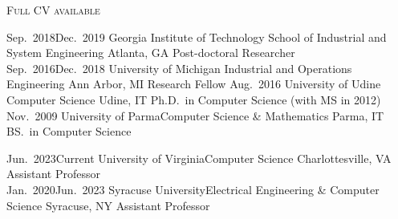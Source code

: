 \documentclass[localFont,alternative]{documentMETADATA}
\begin{document}
\makecvheader\sloppy\allowdisplaybreaks


	\makecvfooter
		{\textsc{}} %
		{\textsc{Full CV available  }}
		{\thepage}




\vspace{-6pt}
\begin{experiences}
  \job
    {Sep.~2018}{Dec.~2019}
    {Georgia Institute of Technology}
    {School of Industrial and System Engineering}
    {Atlanta, GA}
    {Post-doctoral Researcher}\\[-10pt]
  \job
    {Sep.~2016}{Dec.~2018}
    {University of Michigan}
    {Industrial and Operations Engineering}
    {Ann Arbor, MI}
    {Research Fellow}
  \job
    {}{Aug.~2016}
    {University of Udine}%
    {Computer Science}
    {Udine, IT}
    {Ph.D.~in Computer Science (with MS in 2012)}
  \job
    {}{Nov.~2009}
    {University of Parma}{Computer Science \& Mathematics}
    {Parma, IT}
    {BS.~in Computer Science}
\end{experiences}

\vspace{-6pt}
\begin{experiences}
  \job
    {Jun.~2023}{Current}
    {University of Virginia}{Computer Science}
    {Charlottesville, VA}
    {Assistant Professor}\\[-10pt]
  \job
    {Jan.~2020}{Jun.~2023}
    {Syracuse University}{Electrical Engineering \& Computer Science}
    {Syracuse, NY}
    {Assistant Professor}
\end{experiences}


\vspace{-6pt}
\end{document}
